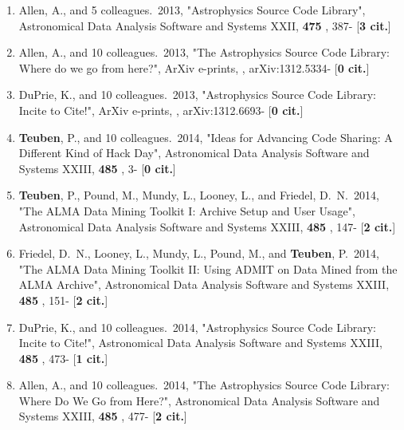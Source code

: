 \documentclass[11pt,letterpaper]{article}
\begin{document}
\begin{enumerate}[resume,label=\textbf{\arabic*}.]
\item  
Allen, A., and 5 colleagues.\  2013,  "Astrophysics Source Code Library", 
Astronomical Data Analysis Software and Systems XXII,  {\bf 475} , 387- 
[{\bf 3 cit.}] 

\item  
Allen, A., and 10 colleagues.\  2013,  "The Astrophysics Source Code 
Library: Where do we go from here?", ArXiv e-prints,  , arXiv:1312.5334- 
[{\bf 0 cit.}] 

\item  
DuPrie, K., and 10 colleagues.\  2013,  "Astrophysics Source Code Library: 
Incite to Cite!", ArXiv e-prints,  , arXiv:1312.6693- [{\bf 0 cit.}] 


\item  
{\bf Teuben}, P., and 10 colleagues.\  2014,  "Ideas for Advancing Code Sharing: 
A Different Kind of Hack Day", Astronomical Data Analysis Software and 
Systems XXIII,  {\bf 485} , 3- [{\bf 0 cit.}] 

\item  
{\bf Teuben}, P., Pound, M., Mundy, L., Looney, L., and Friedel, D.~N.\  2014,  
"The ALMA Data Mining Toolkit I: Archive Setup and User Usage", 
Astronomical Data Analysis Software and Systems XXIII,  {\bf 485} , 147- 
[{\bf 2 cit.}] 

\item  
Friedel, D.~N., Looney, L., Mundy, L., Pound, M., and {\bf Teuben}, P.\  2014,  
"The ALMA Data Mining Toolkit II: Using ADMIT on Data Mined from the ALMA 
Archive", Astronomical Data Analysis Software and Systems XXIII,  {\bf 485} 
, 151- [{\bf 2 cit.}] 

\item  
DuPrie, K., and 10 colleagues.\  2014,  "Astrophysics Source Code Library: 
Incite to Cite!", Astronomical Data Analysis Software and Systems XXIII,  
{\bf 485} , 473- [{\bf 1 cit.}] 

\item  
Allen, A., and 10 colleagues.\  2014,  "The Astrophysics Source Code 
Library: Where Do We Go from Here?", Astronomical Data Analysis Software 
and Systems XXIII,  {\bf 485} , 477- [{\bf 2 cit.}] 




\end{enumerate}
\end{document}
